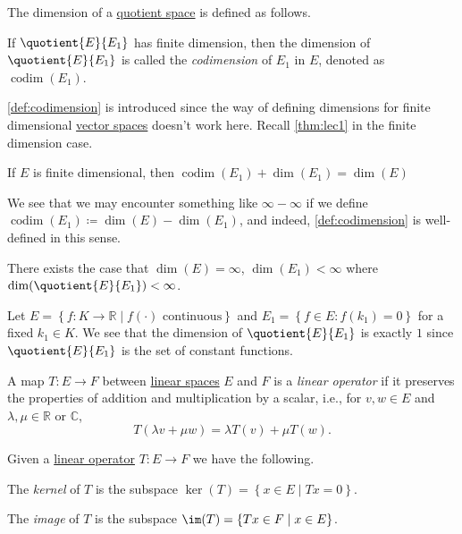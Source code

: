 The dimension of a \hyperref[def:quotient-space]{quotient space} is defined as follows.

\begin{definition}[Codimension]\label{def:codimension}
	If \(\quotient{E}{E_1} \) has finite dimension, then the dimension of \(\quotient{E}{E_1} \) is called the \emph{codimension} of \(E_1\) in \(E\), denoted as \(\mathop{\mathrm{codim}}(E_1)\).
\end{definition}

\autoref{def:codimension} is introduced since the way of defining dimensions for finite dimensional \hyperref[def:linear-vector-space]{vector spaces} doesn't work here. Recall \autoref{thm:lec1} in the finite dimension case.

\begin{theorem}\label{thm:lec1}
	If \(E\) is finite dimensional, then \(\mathop{\mathrm{codim}}(E_1) + \dim (E_1) = \dim(E)\)
\end{theorem}

We see that we may encounter something like \(\infty - \infty \) if we define \(\mathop{\mathrm{codim}}(E_1) \coloneqq \dim(E) - \dim(E_1)\), and indeed, \autoref{def:codimension} is well-defined in this sense.

\begin{eg}
	There exists the case that \(\dim(E) = \infty \), \(\dim(E_1) < \infty\) where \(\dim(\quotient{E}{E_1} )<\infty \).
\end{eg}
\begin{explanation}
	Let \(E = \left\{ f\colon K\to \mathbb{R} \mid f(\cdot) \text{ continuous}  \right\} \) and \(E_1 = \left\{ f\in E\colon f(k_1) = 0 \right\} \) for a fixed \(k_1\in K\). We see that the dimension of \(\quotient{E}{E_1} \) is exactly \(1\) since \(\quotient{E}{E_1} \) is the set of constant functions.
\end{explanation}

\begin{definition}\label{def:linear-op}
	A map \(T\colon E\to F\) between \hyperref[def:linear-vector-space]{linear spaces} \(E\) and \(F\) is a \emph{linear operator} if it preserves the properties of addition and multiplication by a scalar, i.e., for \(v, w\in E\) and \(\lambda , \mu \in \mathbb{R}\) or \(\mathbb{C}\),
	\[
		T(\lambda v + \mu w) = \lambda T(v) + \mu T(w).
	\]
\end{definition}

\begin{definition*}
	Given a \hyperref[def:linear-op]{linear operator} \(T\colon E \to F\) we have the following.
	\begin{definition}[Kernel]\label{def:kernel}
		The \emph{kernel} of \(T\) is the subspace \(\ker(T) = \left\{ x\in E\mid Tx=0 \right\} \).
	\end{definition}

	\begin{definition}[Image]\label{def:image}
		The \emph{image} of \(T\) is the subspace \(\im(T) = \left\{ Tx\in F\mid x\in E \right\} \).
	\end{definition}
\end{definition*}

